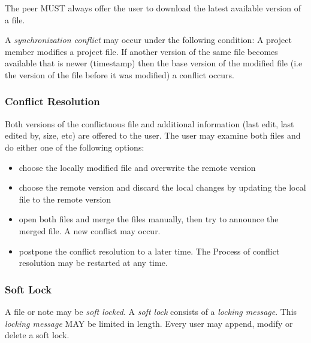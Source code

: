 
The peer MUST always offer the user to download the latest available version of a file.

A \emph{synchronization conflict} may occur under the following condition: A project member modifies a project file. If another version of the same file becomes available that is newer (timestamp) then the base version of the modified file (i.e the version of the file before it was modified) a conflict occurs.

\subsubsection{Conflict Resolution}
Both versions of the conflictuous file and additional information (last edit, last edited by, size, etc) are offered to the user. The user may examine both files and do either one of the following options:
\begin{itemize}
\item choose the locally modified file and overwrite the remote version
\item choose the remote version and discard the local changes by updating the local file to the remote version
\item open both files and merge the files manually, then try to announce the merged file. A new conflict may occur.
\item postpone the conflict resolution to a later time. The Process of conflict resolution may be restarted at any time.
\end{itemize}

\subsubsection{Soft Lock}
A file or note may be \emph{soft locked}. A \emph{soft lock} consists of a \emph{locking message}. This \emph{locking message} MAY be limited in length. Every user may append, modify or delete a soft lock. 

